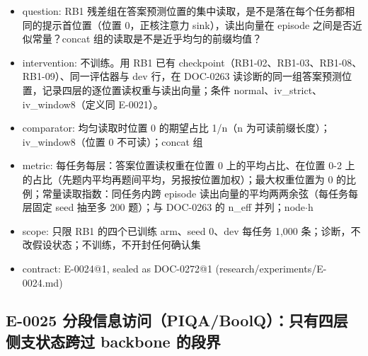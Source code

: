 \documentclass[11pt]{article}
\begin{document}
\begin{itemize}
\item question: RB1 残差组在答案预测位置的集中读取，是不是落在每个任务都相同的提示首位置（位置 0，正核注意力 sink），读出向量在 episode 之间是否近似常量？concat 组的读取是不是近乎均匀的前缀均值？
\item intervention: 不训练。用 RB1 已有 checkpoint（RB1-02、RB1-03、RB1-08、RB1-09）、同一评估器与 dev 行，在 DOC-0263 读诊断的同一组答案预测位置，记录四层的逐位置读权重与读出向量；条件 normal、iv\_strict、iv\_window8（定义同 E-0021）。
\item comparator: 均匀读取时位置 0 的期望占比 1/n（n 为可读前缀长度）；iv\_window8（位置 0 不可读）；concat 组
\item metric: 每任务每层：答案位置读权重在位置 0 上的平均占比、在位置 0-2 上的占比（先题内平均再题间平均，另报按位置加权）；最大权重位置为 0 的比例；常量读取指数：同任务内跨 episode 读出向量的平均两两余弦（每任务每层固定 seed 抽至多 200 题）；与 DOC-0263 的 n\_eff 并列；node\ensuremath{\cdot}h
\item scope: 只限 RB1 的四个已训练 arm、seed 0、dev 每任务 1,000 条；诊断，不改假设状态；不训练，不开封任何确认集
\item contract: E-0024@1, sealed as DOC-0272@1 (research/experiments/E-0024.md)
\end{itemize}

\subsection*{E-0025 分段信息访问（PIQA/BoolQ）：只有四层侧支状态跨过 backbone 的段界}
\end{document}
